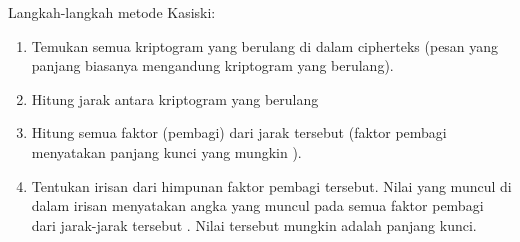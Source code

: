 \documentclass{article}
\begin{document}

Langkah-langkah metode Kasiski:

\begin{enumerate}
  \item Temukan semua kriptogram yang berulang di dalam cipherteks (pesan yang panjang biasanya mengandung kriptogram yang berulang).
  \item Hitung jarak antara kriptogram yang berulang
  \item Hitung semua faktor (pembagi) dari jarak tersebut (faktor pembagi menyatakan panjang kunci yang mungkin ).
  \item Tentukan irisan dari himpunan faktor pembagi tersebut. Nilai yang muncul di dalam irisan menyatakan angka yang muncul pada semua faktor pembagi dari jarak-jarak tersebut . Nilai tersebut mungkin adalah panjang kunci.
\end{enumerate}
\end{document}
